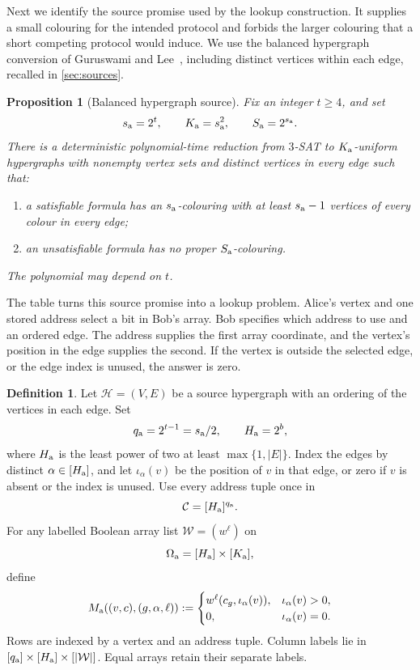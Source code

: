 \documentclass[11pt]{article} \usepackage[utf8]{inputenc}
\theoremstyle{plain} \newtheorem{theorem}{Theorem}[section]
\newtheorem{proposition}[proposition]{Proposition}
\theoremstyle{definition} \newaliascnt{definition}{theorem}
\newtheorem{definition}[definition]{Definition} \aliascntresetthe{definition}
\begin{document}
Next we identify the source promise used by the lookup construction. It supplies
a small colouring for the intended protocol and forbids the larger colouring
that a short competing protocol would induce. We use the balanced hypergraph
conversion of Guruswami and Lee~\cite{guruswami2018balanced}, including distinct
vertices within each edge, recalled in \cref{sec:sources}.

\begin{proposition}[Balanced hypergraph source]\label{yao:source}
Fix an integer $t\ge4$, and set
\[
s_{\rm a}=2^t,\qquad K_{\rm a}=s_{\rm a}^2,\qquad S_{\rm a}=2^{s_{\rm a}}.
\]
There is a deterministic polynomial-time reduction from $3$-SAT to
$K_{\rm a}$-uniform hypergraphs with nonempty vertex sets and distinct vertices
in every edge such that:
\begin{enumerate}
\item a satisfiable formula has an $s_{\rm a}$-colouring with at least $s_{\rm a}-1$ vertices of every colour in every edge;
\item an unsatisfiable formula has no proper $S_{\rm a}$-colouring.
\end{enumerate}
The polynomial may depend on $t$.
\end{proposition}

The table turns this source promise into a lookup problem. Alice's vertex and
one stored address select a bit in Bob's array. Bob specifies which address to
use and an ordered edge. The address supplies the first array coordinate, and
the vertex's position in the edge supplies the second. If the vertex is outside
the selected edge, or the edge index is unused, the answer is zero.

\begin{definition}\label{def:alternating-table}
Let $\mathcal H=(V,E)$ be a source hypergraph with an ordering of the vertices
in each edge. Set
\[
q_{\rm a}=2^{t-1}=s_{\rm a}/2, \qquad H_{\rm a}=2^b,
\]
where $H_{\rm a}$ is the least power of two at least $\max\{1,|E|\}$. Index the
edges by distinct $\alpha\in[H_{\rm a}]$, and let $\iota_\alpha(v)$ be the
position of $v$ in that edge, or zero if $v$ is absent or the index is unused.
Use every address tuple once in
\[
\mathcal C=[H_{\rm a}]^{q_{\rm a}}.
\]
For any labelled Boolean array list $\mathcal W=(w^\ell)$ on
\[
\Omega_{\rm a}=[H_{\rm a}]\times[K_{\rm a}],
\]
define
\[
M_{\rm a}((v,c),(g,\alpha,\ell)):=
\begin{cases}
w^\ell(c_g,\iota_\alpha(v)),&\iota_\alpha(v)>0,\\
0,&\iota_\alpha(v)=0.
\end{cases}
\]
Rows are indexed by a vertex and an address tuple. Column labels lie in
$[q_{\rm a}]\times[H_{\rm a}]\times[|\mathcal W|]$. Equal arrays retain their
separate labels.
\end{definition}
\end{document}
